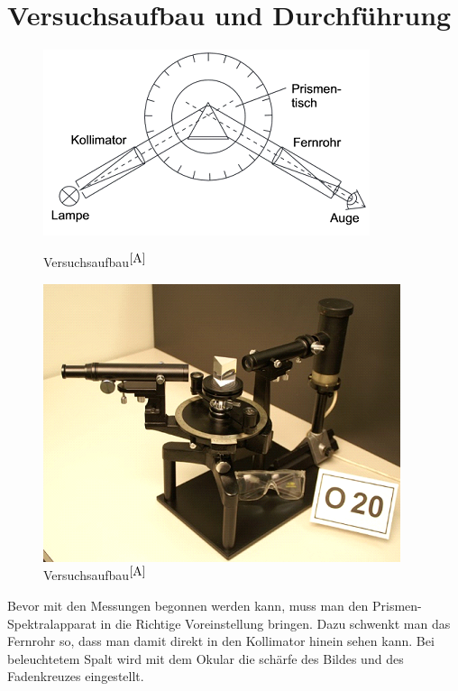 \documentclass[fontsize=12pt]{scrartcl}
\begin{document}
\section{Versuchsaufbau und Durchführung}

\begin{figure}[h]
\begin{minipage}{0.5\textwidth}
\centering
\includegraphics[scale=0.75]{Graphik/O20-1}
\caption{Versuchsaufbau$^{\cite{A}}$}
\end{minipage}
\begin{minipage}{0.5\textwidth}
\centering
\includegraphics[scale=0.5]{Graphik/Versuchsaufbau}
\caption{Versuchsaufbau$^{\cite{A}}$}
\end{minipage}
\end{figure}
\noindent
Bevor mit den Messungen begonnen werden kann, muss man den Prismen-Spektralapparat in die Richtige Voreinstellung bringen. Dazu schwenkt man das Fernrohr so, dass man damit direkt in den Kollimator hinein sehen kann. Bei beleuchtetem Spalt wird mit dem Okular die schärfe des Bildes und des Fadenkreuzes eingestellt.
\end{document}

